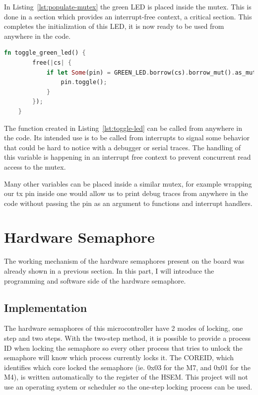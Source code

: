 In Listing~\ref{lst:populate-mutex} the green LED is placed inside the mutex. This is done in a  section which provides an interrupt-free context, a critical section. This completes the initialization of this LED, it is now ready to be used from anywhere in the code.

\begin{lstlisting}[language=Rust,frame=single,float=!ht,style=customrust,label={lst:toggle-led},caption={A LED Toggle Function}]
    fn toggle_green_led() {
        free(|cs| {
            if let Some(pin) = GREEN_LED.borrow(cs).borrow_mut().as_mut() {
                pin.toggle();
            }
        });
    }
\end{lstlisting}

The function created in Listing~\ref{lst:toggle-led} can be called from anywhere in the code. Its intended use is to be called from interrupts to signal some behavior that could be hard to notice with a debugger or serial traces. The handling of this variable is happening in an interrupt free context to prevent concurrent read access to the mutex.

Many other variables can be placed inside a similar mutex, for example wrapping our tx pin inside one would allow us to print debug traces from anywhere in the code without passing the pin as an argument to functions and interrupt handlers.

\section{Hardware Semaphore}

The working mechanism of the hardware semaphores present on the board was already shown in a previous section. In this part, I will introduce the programming and software side of the hardware semaphore.

\subsection{Implementation}

The hardware semaphores of this microcontroller have 2 modes of locking, one step and two steps. With the two-step method, it is possible to provide a process ID when locking the semaphore so every other process that tries to unlock the semaphore will know which process currently locks it. The COREID, which identifies which core locked the semaphore (ie. 0x03 for the M7, and 0x01 for the M4), is written automatically to the register of the HSEM. This project will not use an operating system or scheduler so the one-step locking process can be used.

